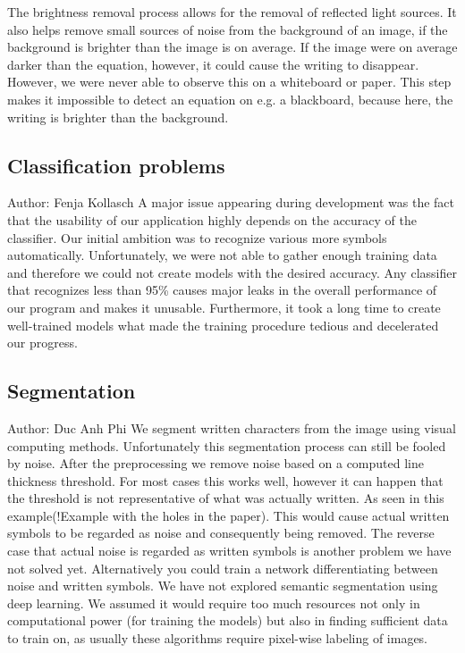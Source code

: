\documentclass[12pt]{article}
\begin{document}
	The brightness removal process allows for the removal of reflected light sources.
	It also helps remove small sources of noise from the background of an image, if the background is brighter than the image is on average.
	If the image were on average darker than the equation, however, it could cause the writing to disappear.
	However, we were never able to observe this on a whiteboard or paper.
	This step makes it impossible to detect an equation on e.g. a blackboard, because here, the writing is brighter than the background.
	
	\subsection{Classification problems}
	\small{Author: Fenja Kollasch} \newline \newline
	A major issue appearing during development was the fact that the usability of our application highly depends on the accuracy of the classifier. Our initial ambition was to recognize various more symbols automatically. Unfortunately, we were not able to gather enough training data and therefore we could not create models with the desired accuracy. Any classifier that recognizes less than 95\% causes major leaks in the overall performance of our program and makes it unusable. Furthermore, it took a long time to create well-trained models what made the training procedure tedious and decelerated our progress.

		
	\subsection{Segmentation}
	\small{Author: Duc Anh Phi} \newline \newline
	We segment written characters from the image using visual computing methods. Unfortunately this segmentation process can still be fooled by noise. After the preprocessing we remove noise based on a computed line thickness threshold. For most cases this works well, however it can happen that the threshold is not representative of what was actually written. As seen in this example(!Example with the holes in the paper). This would cause actual written symbols to be regarded as noise and consequently being removed. The reverse case that actual noise is regarded as written symbols is another problem we have not solved yet. Alternatively you could train a network differentiating between noise and written symbols. We have not explored semantic segmentation using deep learning. We assumed it would require too much resources not only in computational power (for training the models) but also in finding sufficient data to train on, as usually these algorithms require pixel-wise labeling of images.
\end{document}
